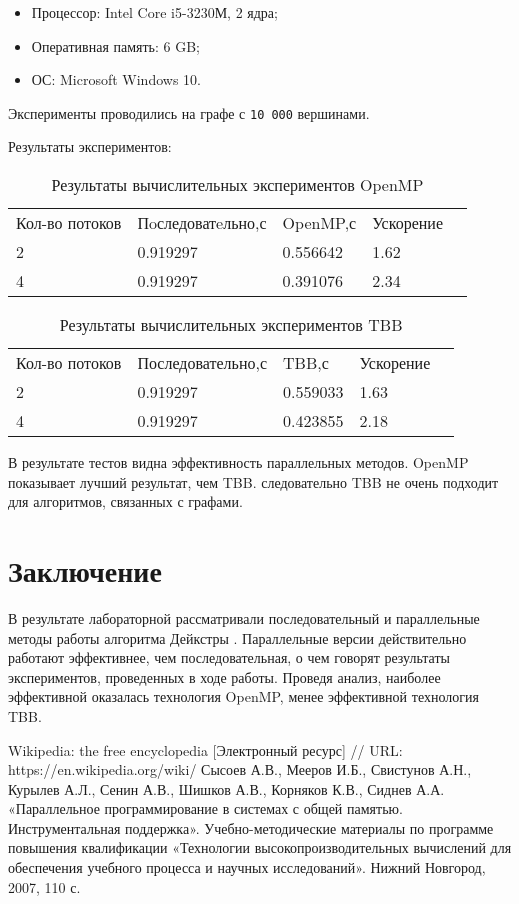 \documentclass{report}
\begin{document}
\begin{itemize}
\item Процессор: Intel Core i5-3230М, 2 ядра;
\item Оперативная память: 6 GB;
\item ОС: Microsoft Windows 10.
\end{itemize}

\par Эксперименты проводились на графе с \verb|10 000| вершинами. 
\par Результаты экспериментов:
\begin{table}[!h]
\centering
\begin{tabular}{lllll}
Кол-во потоков & Пoследоватeльно,с & OpenMP,с & Ускорение  \\
2 & 0.919297 & 0.556642 & 1.62  \\
4 & 0.919297 & 0.391076 & 2.34  \\
\end{tabular}
\caption{Результаты вычислительных экспериментов OpenMP}
\end{table}

\begin{table}[!h]
\centering
\begin{tabular}{lllll}
Кол-во потоков & Последовательно,с & TBB,с & Ускорение  \\
2 & 0.919297 & 0.559033 & 1.63  \\
4 & 0.919297 & 0.423855 & 2.18  \\
\end{tabular}
\caption{Результаты вычислительных экспериментов TBB}
\end{table}


\par В результате тестов видна эффективность параллельных методов. OpenMP показывает лучший результат, чем TBB. следовательно TBB не очень подходит для алгоритмов, связанных с графами.
\newpage


\section*{Заключение}
В результате лабораторной рассматривали последовательный и параллельные методы работы алгоритма Дейкстры .
Параллельные версии действительно работают эффективнее, чем последовательная, о чем говорят результаты экспериментов, проведенных в ходе работы.
Проведя анализ, наиболее эффективной оказалась технология OpenMP, менее эффективной технология TBB.

\newpage
\begin{thebibliography}{1}
 Wikipedia: the free encyclopedia [Электронный ресурс] // URL: https://en.wikipedia.org/wiki/
 Сысоев А.В., Мееров И.Б., Свистунов А.Н., Курылев А.Л., Сенин А.В., Шишков А.В., Корняков К.В., Сиднев А.А. «Параллельное программирование в системах с общей памятью. Инструментальная поддержка». Учебно-методические материалы по программе повышения квалификации «Технологии высокопроизводительных вычислений для обеспечения учебного процесса и научных исследований». Нижний Новгород, 2007, 110 с. 
\end{thebibliography}
\newpage
\end{document}
